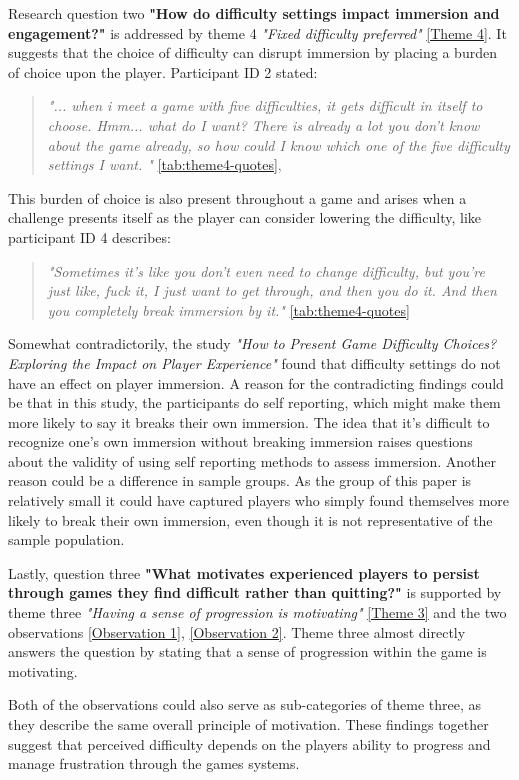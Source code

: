 Research question two \textbf{"How do difficulty settings impact immersion and engagement?"} is addressed by theme 4 \textit{"Fixed difficulty preferred"} \ref{Theme 4}. It suggests that the choice of difficulty can disrupt immersion by placing a burden of choice upon the player. Participant ID 2 stated:
\begin{quote}
    \textit{"... when i meet a game with five difficulties, it gets difficult in itself to choose. Hmm... what do I want? There is already a lot you don't know about the game already, so how could I know which one of the five difficulty settings I want. "} \ref{tab:theme4-quotes},
\end{quote}
This burden of choice is also present throughout a game and arises when a challenge presents itself as the player can consider lowering the difficulty, like participant ID 4 describes:
\begin{quote}
    \textit{"Sometimes it's like you don't even need to change difficulty, but you're just like, fuck it, I just want to get through, and then you do it. And then you completely break immersion by it."} \ref{tab:theme4-quotes}
\end{quote}
Somewhat contradictorily, the study \textit{"How to Present Game Difficulty Choices? Exploring the Impact on Player Experience"} \cite{jan_d_smeddinck_how_2016} found that difficulty settings do not have an effect on player immersion. A reason for the contradicting findings could be that in this study, the participants do self reporting, which might make them more likely to say it breaks their own immersion. The idea that it's difficult to recognize one's own immersion without breaking immersion raises questions about the validity of using self reporting methods to assess immersion. Another reason could be a difference in sample groups. As the group of this paper is relatively small it could have captured players who simply found themselves more likely to break their own immersion, even though it is not representative of the sample population.

Lastly, question three \textbf{"What motivates experienced players to persist through games they find difficult rather than quitting?"} is supported by theme three \textit{"Having a sense of progression is motivating"} \ref{Theme 3} and the two observations \ref{Observation 1}, \ref{Observation 2}. Theme three almost directly answers the question by stating that a sense of progression within the game is motivating.

Both of the observations could also serve as sub-categories of theme three, as they describe the same overall principle of motivation. These findings together suggest that perceived difficulty depends on the players ability to progress and manage frustration through the games systems. 

